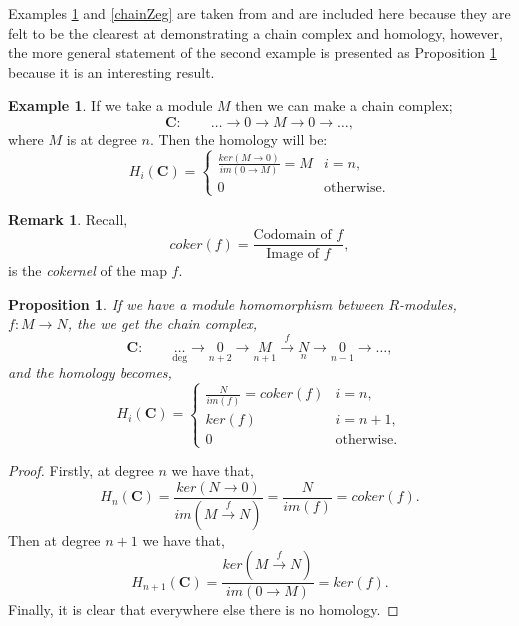 \documentclass[11.5pt, twoside, a4paper, titlepage]{report}
\theoremstyle{definition}
\newtheorem{rem}[mydef]{Remark}
\newtheorem{eg}[mydef]{Example}
\theoremstyle{plain}
\newtheorem{prop}[mydef]{Proposition}
\begin{document}
Examples \ref{chainMeg} and \ref{chainZeg} are taken from \cite{CB1} and are included here because they are felt to be the clearest at demonstrating a chain complex and homology, however, the more general statement of the second example is presented as Proposition \ref{chainhomprop} because it is an interesting result.

\begin{eg}
 \label{chainMeg}
 If we take a module $M$ then we can make a chain complex;
\begin{equation*}
\mathbf{C}: \qquad \dots \xrightarrow{} 0 \xrightarrow{} M \xrightarrow{} 0 \xrightarrow{} \dots,
\end{equation*}
where $M$ is at degree $n$. Then the homology will be:
\begin{equation*}
H_i(\mathbf{C})=\begin{cases}
\frac{ker(M \rightarrow 0)}{im(0 \rightarrow M)}=M & i=n,\\
0 & \text{otherwise}.
\end{cases}
\end{equation*}
\end{eg}

\begin{rem}
Recall, 
\begin{equation*}
coker(f)= \frac{\text{Codomain of }f}{\text{Image of }f},
\end{equation*}
is the \emph{cokernel} of the map $f$.
\end{rem}

\begin{prop}  \label{chainhomprop}
If we have a module homomorphism between $R$-modules, $f: M \xrightarrow{} N$, the we get the chain complex,
\begin{equation*}
\mathbf{C}: \qquad \underset{\text{deg}}{\dots} \xrightarrow{}\underset{n+2}{0} \xrightarrow{} \underset{n+1}{M} \xrightarrow{f}\underset{n}{N} \xrightarrow{} \underset{n-1}{0} \xrightarrow{}\dots ,
\end{equation*}
and the homology becomes,
\begin{equation*}
H_i(\mathbf{C})=
\begin{cases}
\frac{N}{im(f)}=coker(f) & i=n,\\
ker(f) & i=n+1,\\
0 & \text{otherwise}.
\end{cases}
\end{equation*}
\end{prop}
\begin{proof}
Firstly, at degree $n$ we have that,
\begin{equation*}
H_n(\mathbf{C})=\frac{ker(N\xrightarrow{}0)}{im(M\xrightarrow{f}N)}=\frac{N}{im(f)}=coker(f).
\end{equation*}
Then at degree $n+1$ we have that,
\begin{equation*}
H_{n+1}(\mathbf{C})=\frac{ker(M\xrightarrow{f}N)}{im(0\xrightarrow{}M)}=ker(f).
\end{equation*}
Finally, it is clear that everywhere else there is no homology.
\end{proof}
\end{document}
